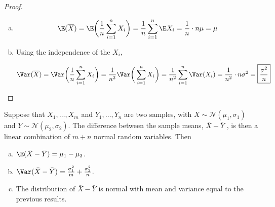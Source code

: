 \begin{proof}

\begin{enumerate}[(a)]

\item

\[
\E(\overline{X}) = \E \bigg( \frac{1}{n} \sum_{i=1}^n X_i\bigg) = \frac{1}{n} \sum_{i=1}^n \E   X_i  = \frac{1}{n} \cdot n \mu = \mu
\]

\item

Using the independence of the \(X_i\),

\[
\Var (\overline{X}) = \Var \bigg( \frac{1}{n} \sum_{i=1}^n X_i\bigg) =  \frac{1}{n^2} \Var \bigg( \sum_{i=1}^n X_i\bigg) =  \frac{1}{n^2} \sum_{i=1}^n  \Var ( X_i ) = \frac{1}{n^2}  \cdot n \sigma^2 = \boxed{\frac{\sigma^2}{n}}
\]

\end{enumerate}

\end{proof}

\begin{proposition} Suppose that \(X_1, \ldots , X_m\) and \(Y_1, \ldots , Y_n\) are two samples, with \(X \sim  \mathcal{N}(\mu_1, \sigma_1)\) and \(Y \sim  \mathcal{N}(\mu_2, \sigma_2)\). The difference between the sample means, \(\bar{X} - \bar{Y}\) , is then a linear combination of \(m + n\) normal random variables. Then

\begin{enumerate}[a.]

\item \(\E(\bar{X} - \bar{Y}) =  \mu_1 - \mu_2\).

\item \(\Var (\bar{X} - \bar{Y}) = \frac{\sigma_1^2}{m} + \frac{\sigma_2^2}{n}  \).

\item The distribution of \(\bar{X} - \bar{Y}\) is normal with mean and variance equal to the previous results.

\end{enumerate}

\end{proposition}

